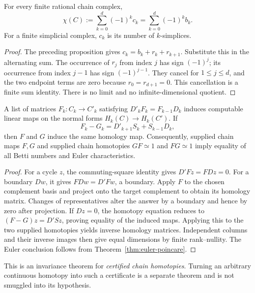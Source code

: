 \begin{theorem}
\label{thm:euler-poincare}
For every finite rational chain complex,
\[
 \chi(C):=\sum_{k=0}^{d}(-1)^kc_k
       =\sum_{k=0}^{d}(-1)^kb_k.
\]
For a finite simplicial complex, $c_k$ is its number of $k$-simplices.
\end{theorem}
\begin{proof}
The preceding proposition gives $c_k=b_k+r_k+r_{k+1}$.  Substitute this in
the alternating sum.  The occurrence of $r_j$ from index $j$ has sign
$(-1)^j$; its occurrence from index $j-1$ has sign $(-1)^{j-1}$.  They
cancel for $1\leq j\leq d$, and the two endpoint terms are zero because
$r_0=r_{d+1}=0$.  This cancellation is a finite sum identity.  There is no
limit and no infinite-dimensional quotient.
\end{proof}

\begin{theorem}
\label{thm:chain-homotopy}
A list of matrices $F_k:C_k\to C'_k$ satisfying
$D'_kF_k=F_{k-1}D_k$ induces computable linear maps on the normal forms
$H_k(C)\to H_k(C')$.  If
\[
 F_k-G_k=D'_{k+1}S_k+S_{k-1}D_k,
\]
then $F$ and $G$ induce the same homology map.  Consequently, supplied
chain maps $F,G$ and supplied chain homotopies $GF\simeq 1$ and
$FG\simeq 1$ imply equality of all Betti numbers and Euler characteristics.
\end{theorem}
\begin{proof}
For a cycle $z$, the commuting-square identity gives $D'Fz=FDz=0$.
For a boundary $D w$, it gives $F D w=D'F w$, a boundary.  Apply $F$ to
the chosen complement basis and project onto the target complement to
obtain its homology matrix.  Changes of representatives alter the answer
by a boundary and hence by zero after projection.  If $Dz=0$, the
homotopy equation reduces to $(F-G)z=D'Sz$, proving equality of the
induced maps.  Applying this to the two supplied homotopies yields inverse
homology matrices.  Independent columns and their inverse images then
give equal dimensions by finite rank--nullity.  The Euler conclusion
follows from Theorem~\ref{thm:euler-poincare}.
\end{proof}

This is an invariance theorem for \emph{certified chain homotopies}.
Turning an arbitrary continuous homotopy into such a certificate is a
separate theorem and is not smuggled into its hypothesis.

